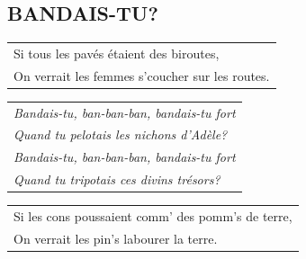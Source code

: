 \documentclass{article}
\begin{document}
\subsection*{BANDAIS-TU?}
\begin{flushleft}
\begin{tabularx}{0.8\textwidth} {
   >{\raggedright\arraybackslash}X}
Si tous les pavés étaient des biroutes,\\
On verrait les femmes s’coucher sur les routes.\\
\end{tabularx}
\end{flushleft}
\begin{flushleft}
\begin{tabularx}{0.8\textwidth} {
   >{\raggedright\arraybackslash}X}
\textit{Bandais-tu, ban-ban-ban, bandais-tu fort}\\
\textit{Quand tu pelotais les nichons d’Adèle?}\\
\textit{Bandais-tu, ban-ban-ban, bandais-tu fort}\\
\textit{Quand tu tripotais ces divins trésors?}\\
\end{tabularx}
\end{flushleft}
\begin{flushleft}
\begin{tabularx}{0.8\textwidth} {
   >{\raggedright\arraybackslash}X}
Si les cons poussaient comm’ des pomm’s de terre,\\
On verrait les pin’s labourer la terre.\\
\end{tabularx}
\end{flushleft}
\end{document}
